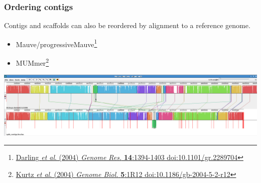 \begin{frame}
  \frametitle{Ordering contigs}
  Contigs and scaffolds can also be reordered by alignment to a reference genome.\\
  \begin{itemize}
    \item Mauve/progressiveMauve\footnote{\tiny{\href{http://dx.doi.org/10.1101/gr.2289704}{Darling \textit{et al}. (2004) \textit{Genome Res.} \textbf{14}:1394-1403 doi:10.1101/gr.2289704}}}
    \item MUMmer\footnote{\tiny{\href{http://dx.doi.org/10.1186/gb-2004-5-2-r12}{Kurtz \textit{et al}. (2004) \textit{Genome Biol.} \textbf{5}:1R12 doi:10.1186/gb-2004-5-2-r12}}}
  \end{itemize}
  \begin{center}
    \includegraphics[width=1\textwidth]{images/mauve_output}
  \end{center}    
\end{frame}
